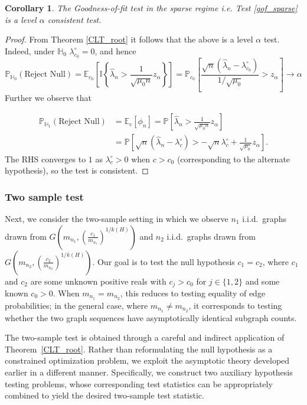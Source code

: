 \documentclass[12pt]{article}
\def\P{\mathbb{P}}
\def\E{\mathbb{E}}
\def\H{\mathbb{H}}
\numberwithin{equation}{section}
\newtheorem{corollary}{Corollary}[section]
\begin{document}
\begin{corollary}
    The Goodness-of-fit test in the sparse regime i.e. Test \ref{gof_sparse} is a level $\alpha$ consistent test.
\end{corollary}

\begin{proof}
 From Theorem \ref{CLT_root} it follows that the above is a level $\alpha$ test.
Indeed, under $\H_0$ $\lambda^{\circ}_{c_0}=0$, and hence
$$\P_{\H_0}(\text{Reject Null})=\E_{c_0}\left[\mathbb{I}\left\{\hat{\lambda}_n>\frac{1}{\sqrt{\mu_0n}}z_{\alpha}\right\}\right]=\P_{c_0}\left[\frac{\sqrt{n}(\hat{\lambda}_n-\lambda_{c_0}^{\circ})}{1/\sqrt{\mu_0}}>z_{\alpha}\right]\rightarrow \alpha$$
Further we observe that

\begin{align*}\P_{\H_1}(\text{Reject Null})&=\E_{c}[\phi_n]=\P[\hat{\lambda}_n>\frac{1}{\sqrt{\mu_0n}}z_{\alpha}]\\
&=\P[\sqrt{n}(\hat{\lambda}_n-\lambda^{\circ}_c)>-\sqrt{n}\lambda^{\circ}_c+\frac{1}{\sqrt{\mu_0}}z_{\alpha}].\end{align*}
The RHS converges to $1$ as $\lambda_c^{\circ}>0$ when $c>c_0$ (corresponding to the alternate hypothesis), so the test is consistent.
\end{proof}


\subsubsection{Two sample test}

Next, we consider the two-sample setting in which we observe $n_1$ i.i.d.\ graphs drawn from 
$G\!\left(m_{n_1}, (\frac{c_1}{m_{n_1}})^{1/k(H)}\right)$ and $n_2$ i.i.d.\ graphs drawn from 
$G\!\left(m_{n_2}, (\frac{c_2}{m_{n_2}})^{1/k(H)}\right)$. Our goal is to test the null hypothesis 
$c_1=c_2$, where $c_1$ and $c_2$ are some unknown positive reals with $c_j>c_0$ for $j\in \{1,2\}$ and some known $c_0>0$.  When $m_{n_1}=m_{n_2}$, this reduces to testing equality of edge probabilities; in the 
general case, where $m_{n_1}\neq m_{n_2}$, it corresponds to testing whether the two graph sequences 
have asymptotically identical subgraph counts. 

The two-sample test is obtained through a careful and indirect application of
Theorem~\ref{CLT_root}. Rather than reformulating the null hypothesis as a
constrained optimization problem, we exploit the asymptotic theory developed
earlier in a different manner. Specifically, we construct two auxiliary
hypothesis testing problems, whose corresponding test statistics can be
appropriately combined to yield the desired two-sample test statistic.
\end{document}
